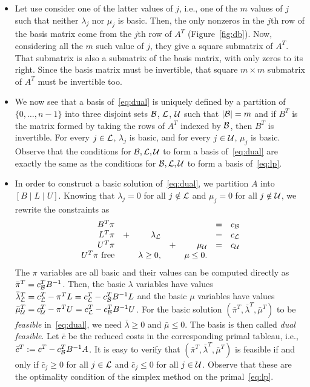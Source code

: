 \begin{itemize}
\item Let use consider one of the latter values of $j$, i.e., one of the
	$m$ values of $j$ such that neither $\lambda_j$ nor $\mu_j$ is basic.
	Then, the only nonzeros in the $j$th row of the basis matrix
	come from the $j$th row of $A^T$ (Figure~\ref{fig:db}).
	Now, considering all the $m$
	such value of $j$, they give a square submatrix of $A^T$.
	That submatrix is also a submatrix of the
	basis matrix, with only zeros to its right.
	Since the basis matrix must be invertible, that square
	$m \times m$ submatrix of $A^T$ must be invertible too.

\item We now see that a basis of~\eqref{eq:dual} is uniquely defined by
	a partition of $\{ 0, \ldots, n-1 \}$ into three disjoint
	sets $\mathcal{B}$, $\mathcal{L}$, $\mathcal{U}$ such that $|\mathcal{B}| = m$ and
	if $B^T$ is the matrix formed by taking
	the rows of $A^T$ indexed by $\mathcal{B}$, then $B^T$ is invertible.
	For every $j \in \mathcal{L}$, $\lambda_j$ is basic,
	and for every $j \in \mathcal{U}$, $\mu_j$ is basic.
	Observe that the conditions for
	$\mathcal{B}, \mathcal{L}, \mathcal{U}$ to form a basis of~\eqref{eq:dual}
	are exactly the same as the conditions for
	$\mathcal{B}, \mathcal{L}, \mathcal{U}$ to form a basis of~\eqref{eq:lp}.

\item In order to construct a basic solution of~\eqref{eq:dual},
	we partition $A$ into $[ B \; | \; L \; | \; U ]$.
	Knowing that $\lambda_j = 0$ for all $j \notin \mathcal{L}$
	and $\mu_j = 0$ for all $j \notin \mathcal{U}$, we rewrite the constraints as
\[
\begin{array}{rcrcrcl}
 B^T \pi & & & & & = & c_{\mathcal{B}} \\
 L^T \pi & + & \lambda_{\mathcal{L}} & & & = & c_{\mathcal{L}} \\
 U^T \pi & & & + & \mu_{\mathcal{U}} & = & c_{\mathcal{U}} \\
 U^T \pi \text{ free} & & \lambda \geq 0, & &  \mu \leq 0. & & 
\end{array}
\]
	The $\pi$ variables are all basic and their values can be computed
	directly as $\bar \pi^T = c_{\mathcal{B}}^T B^{-1}$.
	Then, the basic $\lambda$ variables have values
	$\bar \lambda_{\mathcal{L}}^T
		= c_{\mathcal{L}}^T - \pi^T L = c_{\mathcal{L}}^T - c_{\mathcal{B}}^T B^{-1} L$
	and the basic $\mu$ variables have values
	$\bar \mu_{\mathcal{U}}^T
		= c_{\mathcal{U}}^T - \pi^T U = c_{\mathcal{L}}^T - c_{\mathcal{B}}^T B^{-1} U$.
	For the basic solution $(\bar \pi^T, \bar \lambda^T, \bar \mu^T)$
	to be \emph{feasible} in~\eqref{eq:dual}, we need
	$\bar \lambda \geq 0$ and $\bar \mu \leq 0$.
	The basis is then called \emph{dual feasible}.
	Let $\bar c$ be the reduced costs in the corresponding primal
	tableau, i.e., $\bar c^T := c^T - c_{\mathcal{B}}^T  B^{-1} A$.
	It is easy to verify that $(\bar \pi^T, \bar \lambda^T, \bar \mu^T)$
	is feasible if and only if $\bar c_j \geq 0$ for all $j \in \mathcal{L}$
	and $\bar c_j \leq 0$ for all $j \in \mathcal{U}$. Observe that these
	are the optimality condition of the simplex method on
	the primal~\eqref{eq:lp}.


\end{itemize}
